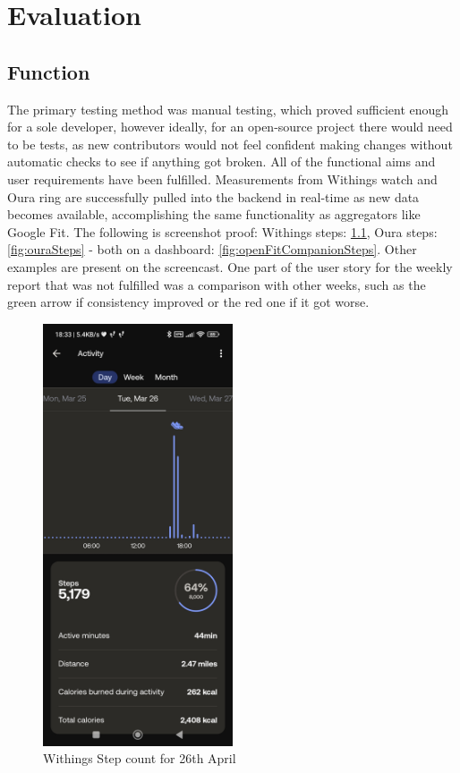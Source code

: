 \chapter{Evaluation}
\label{cha:evaluation}
\section{Function}
The primary testing method was manual testing, which proved sufficient enough for a sole developer, however ideally, for an open-source project there would need to be tests, as new contributors would not feel confident making changes without automatic checks to see if anything got broken.
All of the functional aims and user requirements have been fulfilled. Measurements from Withings watch and Oura ring are successfully pulled into the backend in real-time as new data becomes available, accomplishing the same functionality as aggregators like Google Fit. The following is screenshot proof: Withings steps: \ref{fig:withingsSteps}, Oura steps: \ref{fig:ouraSteps} - both on a dashboard: \ref{fig:openFitCompanionSteps}. Other examples are present on the screencast.
One part of the user story for the weekly report that was not fulfilled was a comparison with other weeks, such as the green arrow if consistency improved or the red one if it got worse. 
\begin{figure}
    
    \centering
    \includegraphics[width=0.5\textwidth,keepaspectratio]{../images/WithingsActivity.jpg}
    \caption{Withings Step count for 26th April}
    \label{fig:withingsSteps}
    
\end{figure}

